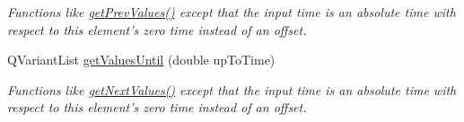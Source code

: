 \begin{DoxyCompactItemize}
\begin{DoxyCompactList}\small\item\em Functions like \hyperlink{class_picto_1_1_analysis_lfp_data_abc3fdc4e54b48f6254793ec88c696665}{get\-Prev\-Values()} except that the input time is an absolute time with respect to this element's zero time instead of an offset. \end{DoxyCompactList}\item 
\hypertarget{class_picto_1_1_analysis_lfp_data_ac491a9b0ffa663f36f27cbccabe1cbec}{Q\-Variant\-List \hyperlink{class_picto_1_1_analysis_lfp_data_ac491a9b0ffa663f36f27cbccabe1cbec}{get\-Values\-Until} (double up\-To\-Time)}\label{class_picto_1_1_analysis_lfp_data_ac491a9b0ffa663f36f27cbccabe1cbec}

\begin{DoxyCompactList}\small\item\em Functions like \hyperlink{class_picto_1_1_analysis_lfp_data_a399178b9bad5e6e9635c67e708ed6ed7}{get\-Next\-Values()} except that the input time is an absolute time with respect to this element's zero time instead of an offset. \end{DoxyCompactList}\end{DoxyCompactItemize}
